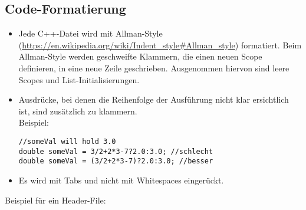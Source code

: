 \documentclass[12pt]{article}
\begin{document}
\subsection{Code-Formatierung}
\begin{itemize}
	\item Jede C++-Datei wird mit Allman-Style (\url{https://en.wikipedia.org/wiki/Indent_style#Allman_style}) formatiert. Beim Allman-Style werden geschweifte Klammern, die einen neuen Scope definieren, in eine neue Zeile geschrieben. Ausgenommen hiervon sind leere Scopes und List-Initialisierungen.
	\item Ausdrücke, bei denen die Reihenfolge der Ausführung nicht klar ersichtlich ist, sind zusätzlich zu klammern.\\
Beispiel:
\begin{lstlisting}
//someVal will hold 3.0
double someVal = 3/2+2*3-7?2.0:3.0; //schlecht
double someVal = (3/2+2*3-7)?2.0:3.0; //besser
\end{lstlisting}
 
	\item Es wird mit Tabs und nicht mit Whitespaces eingerückt.
\end{itemize}
Beispiel für ein Header-File: 
\end{document}
